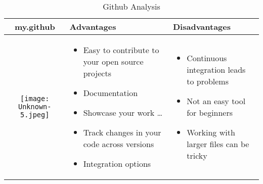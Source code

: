 \documentclass{article}
\begin{document}
	\begin{table}[h!]
		\centering
		\begin{tabular}{ | c | m{5cm} | m{5cm} | }
			\hline
			my.github & Advantages & Disadvantages \\ \hline
			\begin{minipage}{.4\textwidth}
				\texttt{[image: Unknown-5.jpeg]}
			\end{minipage}
		&
		\begin{itemize}
			\item Easy to contribute to your open source projects
			\item Documentation
			\item Showcase your work \ldots
			\item Track changes in your code across versions
			\item Integration options
		\end{itemize}
				&
				\begin{itemize}
					\item Continuous integration leads to problems
					\item Not an easy tool for beginners 
					\item Working with larger files can be tricky
				\end{itemize}
			\\
			\hline
		\end{tabular}
	\caption{Github Analysis}\label{tbl:mygitHub}
			
		
	\end{table}
\end{document}
